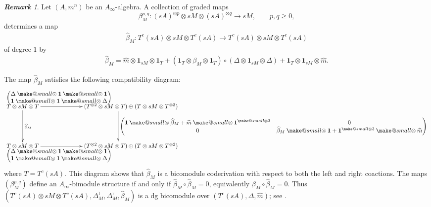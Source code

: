 \documentclass[a4paper, 11pt]{amsart}
\makeatletter
\theoremstyle{definition}
\theoremstyle{remark}
\newtheorem{rem}[thm]{\bf Remark}
\numberwithin{equation}{section}
\newcommand{\LL}{\mathrm{l}}
\newcommand{\RR}{\mathrm{r}}
\newcommand{\id}{\mathbf{1}}
\newcommand{\smallotimes}{\mathbin{\mathpalette\make@small\otimes}}
\newcommand{\make@small}[2]{%
  \vcenter{\hbox{%
    $\m@th\ifx#1\displaystyle\scriptstyle\else\ifx#1\textstyle\scriptstyle
     \else\scriptscriptstyle\fi\fi#2$%
  }}%
}
\makeatother
\begin{document}
\begin{rem}
Let $(A,m^n)$ be an $A_\infty$-algebra. A collection of graded maps
\[
\beta_M^{p,q}\colon (sA)^{\otimes p}\otimes sM\otimes (sA)^{\otimes q}\to sM,
\qquad p,q\geq 0,
\]
determines a map
\begin{align*}
\widehat \beta_M \colon T^c(sA) \otimes sM \otimes T^c(sA) \to T^c(sA) \otimes sM \otimes T^c(sA)
\end{align*}
of degree $1$ by
\begin{align}\label{align:betahat}
\widehat \beta_M = \widehat m \otimes \id_{sM} \otimes \id_{T} + (\id_T \otimes \beta_M \otimes \id_T) \circ (\Delta \otimes \id_{sM} \otimes \Delta) + \id_T \otimes \id_{sM} \otimes \widehat m.
\end{align}

The map $\widehat\beta_M$ satisfies the following compatibility diagram:
\begin{align*}
 \xymatrix@C=7em@R=5em{
 T\otimes sM \otimes T \ar[d]^{\widehat{\beta}_M}
 \ar[r]^{\begin{pmatrix}
 \Delta\smallotimes \id \smallotimes \id \\
 \id \smallotimes \id \smallotimes \Delta
 \end{pmatrix}\qquad\qquad\qquad} &(T^{\otimes 2} \otimes sM\otimes T) \oplus (T\otimes sM\otimes T^{\otimes 2}) \ar@<-5ex>[d]^{\begin{pmatrix}
 \id \smallotimes \widehat{\beta}_M + \widehat m\smallotimes \id^{\smallotimes 3}& 0 \\
 0 & \widehat{\beta}_M \smallotimes \id + \id^{\smallotimes 3}\smallotimes \widehat m
 \end{pmatrix}}\\
 T\otimes sM \otimes T \ar[r]_{\begin{pmatrix}
 \Delta\smallotimes \id \smallotimes \id \\
 \id \smallotimes \id \smallotimes \Delta
 \end{pmatrix}\qquad\qquad\qquad} &(T^{\otimes 2}\otimes sM\otimes T) \oplus (T\otimes sM\otimes T^{\otimes 2})
 }
\end{align*}
where $T=T^c(sA)$. 
This diagram shows that $\widehat\beta_M$ is a bicomodule coderivation with respect to both the left and right coactions.
The maps $(\beta_M^{p,q})$ define an $A_\infty$-bimodule structure if and only if $\widehat\beta_M\circ \widehat\beta_M=0$, equivalently $\beta_M\circ \widehat\beta_M=0$. Thus $(T^c(sA)\otimes sM\otimes T^c(sA),\Delta_M^{\LL}, \Delta_M^{\RR}, \widehat\beta_M)$ is a dg bicomodule over $(T^c(sA),\Delta,\widehat m)$; see \cite[Definition 2.6]{Tra}.
\end{rem}
\end{document}
